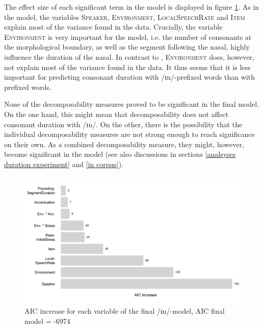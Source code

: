 
The effect size of each significant term in the model is displayed in figure \ref{fig:Effect sizes InComplex Exp}. As in the model, the variables \textsc{Speaker}, \textsc{Environment}, \textsc{LocalSpeechRate} and \textsc{Item} explain most of the variance found in the data. Crucially, the variable \textsc{Environment} is very important for the model, i.e. the number of consonants at the morphological boundary, as well as the segment following the nasal, highly influence the duration of the nasal. In contrast to , \textsc{Environment} does, however, not explain most of the variance found in the data. It thus seems that it is less important for predicting consonant duration with /ɪn/-prefixed words than with prefixed words. 






None of the decomposability measures proved to be significant in the final model. On the one hand, this might mean that decomposability does not affect consonant duration with /ɪn/. On the other, there is the possibility that the individual decomposability measures are not strong enough to reach significance on their own. As a combined decomposability measure, they might, however, become significant in the model (see also discussions in sections \ref{analsyses duration experiment} and \ref {in corpus}).

\clearpage



\begin{figure}[t!]
	\centering
	\includegraphics[scale=0.7]{images/Experiment/AICdecreaseInComplex.png}
	
	\caption{AIC increase for each variable of the final /ɪn/-model, AIC final model = -6974}
	\label{fig:Effect sizes InComplex Exp}
	
\end{figure}


